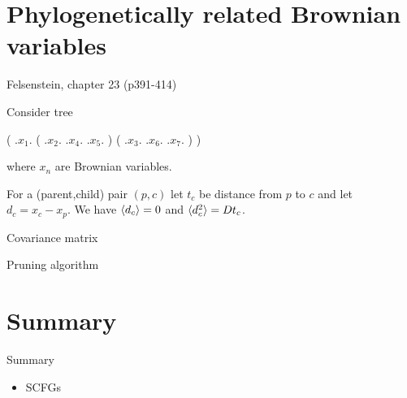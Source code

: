 \documentclass{beamer}
\begin{document}
\section{Phylogenetically related Brownian variables}

\begin{frame}{}

\itemb
\item Felsenstein, chapter 23 (p391-414)
\item Consider tree
\begin{parsetree}
 ( .$x_1$. ( .$x_2$. .$x_4$. .$x_5$. ) ( .$x_3$. .$x_6$. .$x_7$. )  )
\end{parsetree}
where $x_n$ are Brownian variables.
\item For a (parent,child) pair $(p,c)$
let $t_c$ be distance from $p$ to $c$ and let $d_c = x_c - x_p$.
We have $\langle d_c \rangle=0$ and $\langle d_c^2 \rangle = D t_c$.
\item Covariance matrix %
\item Pruning algorithm %
\iteme

\end{frame}



\section*{Summary}

\begin{frame}{Summary}

  \begin{itemize}
  \item SCFGs
  \end{itemize}

\end{frame}
\end{document}
